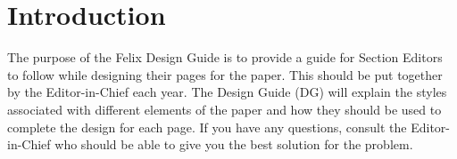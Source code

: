 \chapter{Introduction}
 The purpose of the Felix Design Guide is to provide a guide for Section Editors to follow while designing their pages for the paper. This should be put together by the Editor-in-Chief each year.
The Design Guide (DG) will explain the styles associated with different elements of the paper and how they should be used to complete the design for each page. If you have any questions, consult the Editor-in-Chief who should be able to give you the best solution for the problem. 
